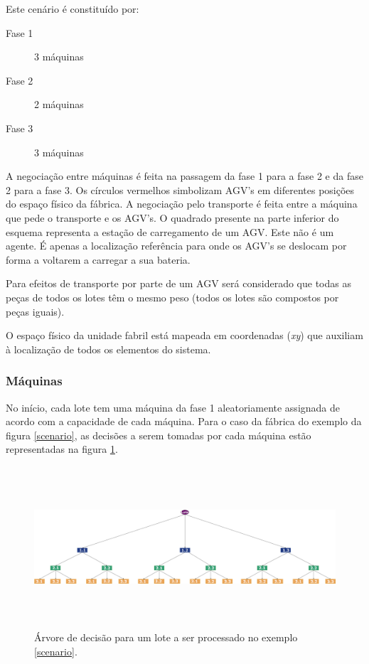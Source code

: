 \begin{titlepage}
\newpage
Este cenário é constituído por:

\begin{description}
\item[Fase 1] 3 máquinas
\item[Fase 2] 2 máquinas 
\item[Fase 3] 3 máquinas
\end{description}

A negociação entre máquinas é feita na passagem da fase 1 para a fase 2 e da fase 2 para a fase 3. Os círculos vermelhos simbolizam AGV's em diferentes posições do espaço físico da fábrica. A negociação pelo transporte é feita entre a máquina que pede o transporte e os AGV's. O quadrado presente na parte inferior do esquema representa a estação de carregamento de um AGV. Este não é um agente. É apenas a localização referência para onde os AGV's se deslocam por forma a voltarem a carregar a sua bateria.

Para efeitos de transporte por parte de um AGV será considerado que todas as peças de todos os lotes têm o mesmo peso (todos os lotes são compostos por peças iguais).

O espaço físico da unidade fabril está mapeada em coordenadas (\textit{xy}) que auxiliam à localização de todos os elementos do sistema.

\subsubsection{Máquinas}

No início, cada lote tem uma máquina da fase 1 aleatoriamente assignada de acordo com a capacidade de cada máquina. Para o caso da fábrica do exemplo da figura \ref{scenario}, as decisões a serem tomadas por cada máquina estão representadas na figura \ref{decisionMach}.\newline\newline

\begin{figure}[H]
  \raggedleft 
    \includegraphics[width=19cm, height = 6cm]{DecisionTreeMachines.png}
  \caption{Árvore de decisão para um lote a ser processado no exemplo \ref{scenario}.}
  \label{decisionMach}
\end{figure}


\end{titlepage}
